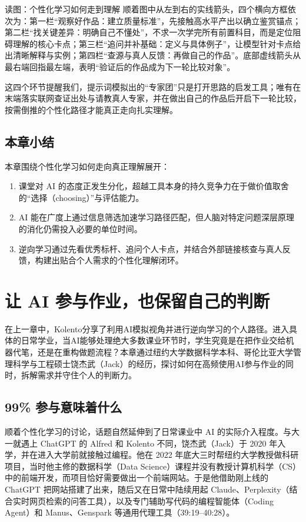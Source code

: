 \documentclass[UTF8,a4paper,11pt,fontset=fandol]{ctexart}
\begin{document}
\begin{knowledgebox}{读图：个性化学习如何走到理解}
顺着图中从左到右的实线箭头，四个横向方框依次为：第一栏“观察好作品：建立质量标准”，先接触高水平产出以确立鉴赏锚点；第二栏“找关键差异：明确自己不懂处”，不求一次学完所有前置科目，而是定位阻碍理解的核心卡点；第三栏“追问并补基础：定义与具体例子”，让模型针对卡点给出清晰解释与实例；第四栏“查源与真人反馈：再做自己的作品”。底部虚线箭头从最右端回指最左端，表明“验证后的作品成为下一轮比较对象”。
\end{knowledgebox}
这四个环节提醒我们，提示词模拟出的“专家团”只是打开思路的启发工具；唯有在末端落实联网查证出处与请教真人专家，并在做出自己的作品后开启下一轮比较，按需倒推的个性化路径才能真正走向扎实理解。
\subsection{本章小结}
本章围绕个性化学习如何走向真正理解展开：
\begin{enumerate}
\item 课堂对 AI 的态度正发生分化，超越工具本身的持久竞争力在于做价值取舍的“选择（choosing）”与评估能力。
\item AI 能在广度上通过信息筛选加速学习路径匹配，但人脑对特定问题深层原理的消化仍需投入必要的单位时间。
\item 逆向学习通过先看优秀标杆、追问个人卡点，并结合外部链接核查与真人反馈，构建出贴合个人需求的个性化理解闭环。
\end{enumerate}
\section{让 AI 参与作业，也保留自己的判断}
在上一章中，Kolento分享了利用AI模拟视角并进行逆向学习的个人路径。进入具体的日常学业，当AI能够处理绝大多数课业环节时，学生究竟是在把作业交给机器代笔，还是在重构做题流程？本章通过纽约大学数据科学本科、哥伦比亚大学管理科学与工程硕士饶杰武（Jack）的经历，探讨如何在高频使用AI参与作业的同时，拆解需求并守住个人的判断力。
\subsection{99\% 参与意味着什么}
顺着个性化学习的讨论，话题自然延伸到了日常课业中 AI 的实际介入程度。与大一就遇上 ChatGPT 的 Alfred 和 Kolento 不同，饶杰武（Jack）于 2020 年入学，并在进入大学前就接触过编程。他在 2022 年底大三时帮纽约大学教授做科研项目，当时他主修的数据科学（Data Science）课程并没有教授计算机科学（CS）中的前端开发，而项目恰好需要做出一个前端网站。于是他借助刚上线的 ChatGPT 把网站搭建了出来，随后又在日常中陆续用起 Claude、Perplexity（结合实时网页检索的问答工具），以及专门辅助写代码的编程智能体（Coding Agent）和 Manus、Genspark 等通用代理工具（39:19–40:28）。
\end{document}
